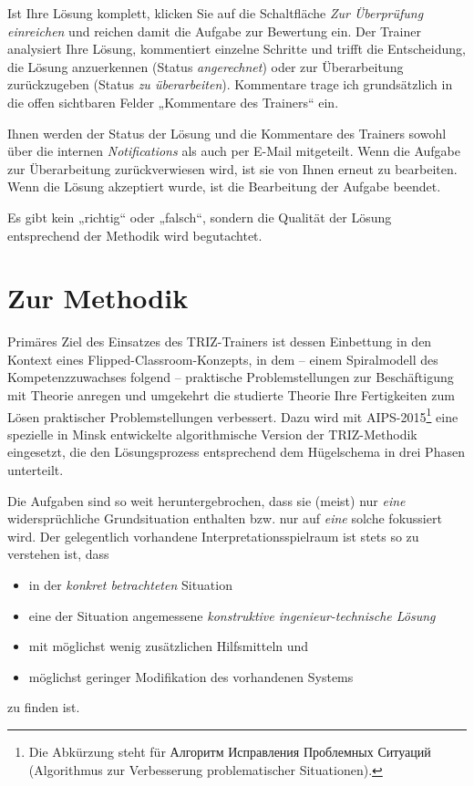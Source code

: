 \documentclass[11pt,a4paper]{article}
\begin{document}
Ist Ihre Lösung komplett, klicken Sie auf die Schaltfläche \emph{Zur
  Überprüfung einreichen} und reichen damit die Aufgabe zur Bewertung ein.
Der Trainer analysiert Ihre Lösung, kommentiert einzelne Schritte und trifft
die Entscheidung, die Lösung anzuerkennen (Status \emph{angerechnet}) oder zur
Überarbeitung zurückzugeben (Status \emph{zu überarbeiten}).  Kommentare trage
ich grundsätzlich in die offen sichtbaren Felder „Kommentare des Trainers“
ein.

Ihnen werden der Status der Lösung und die Kommentare des Trainers sowohl über
die internen \emph{Notifications} als auch per E-Mail mitgeteilt.  Wenn die
Aufgabe zur Überarbeitung zurückverwiesen wird, ist sie von Ihnen erneut zu
bearbeiten.  Wenn die Lösung akzeptiert wurde, ist die Bearbeitung der Aufgabe
beendet.

Es gibt kein „richtig“ oder „falsch“, sondern die Qualität der Lösung
entsprechend der Methodik wird begutachtet.

\section{Zur Methodik}

Primäres Ziel des Einsatzes des TRIZ-Trainers ist dessen Einbettung in den
Kontext eines Flipped-Classroom-Konzepts, in dem -- einem Spiralmodell des
Kompetenzzuwachses folgend -- praktische Problemstellungen zur Beschäftigung
mit Theorie anregen und umgekehrt die studierte Theorie Ihre Fertigkeiten zum
Lösen praktischer Problemstellungen verbessert. Dazu wird mit
AIPS-2015\footnote{Die Abkürzung steht für \foreignlanguage{russian}{Алгоритм
    Исправления Проблемных Ситуаций} (Algorithmus zur Verbesserung
  problematischer Situationen).}  eine spezielle in Minsk entwickelte
algorithmische Version der TRIZ-Methodik eingesetzt, die den Lösungsprozess
entsprechend dem Hügelschema in drei Phasen unterteilt.

Die Aufgaben sind so weit heruntergebrochen, dass sie (meist) nur \emph{eine}
widersprüchliche Grundsituation enthalten bzw. nur auf \emph{eine} solche
fokussiert wird.  Der gelegentlich vorhandene Interpretationsspielraum ist
stets so zu verstehen ist, dass
\begin{itemize}[noitemsep]
\item in der \emph{konkret betrachteten} Situation
\item eine der Situation angemessene \emph{konstruktive ingenieur-technische
  Lösung}
\item mit möglichst wenig zusätzlichen Hilfsmitteln und 
\item möglichst geringer Modifikation des vorhandenen Systems
\end{itemize}
zu finden ist.
\end{document}
